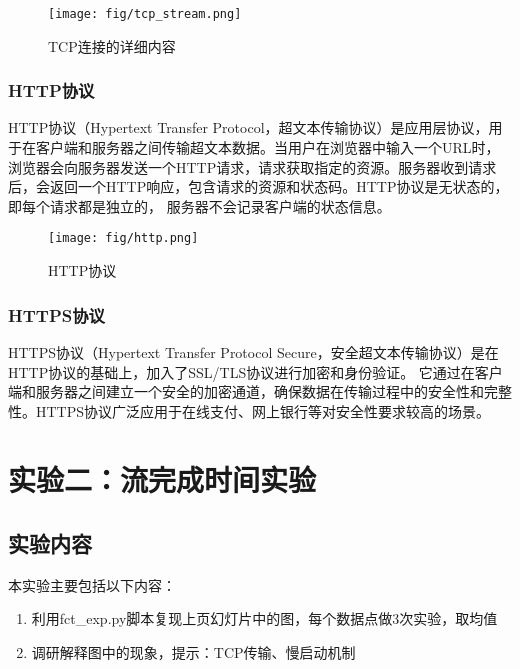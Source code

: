 \documentclass[11pt]{article}
\begin{document}
\begin{figure}[H]
  \centering
  \texttt{[image: fig/tcp\_stream.png]}
  \caption{TCP连接的详细内容}
  \label{fig:tcp_stream}
\end{figure}

\subsubsection{HTTP协议}
HTTP协议（Hypertext Transfer Protocol，超文本传输协议）是应用层协议，用于在客户端和服务器之间传输超文本数据。当用户在浏览器中输入一个URL时，
浏览器会向服务器发送一个HTTP请求，请求获取指定的资源。服务器收到请求后，会返回一个HTTP响应，包含请求的资源和状态码。HTTP协议是无状态的，即每个请求都是独立的，
服务器不会记录客户端的状态信息。

\begin{figure}[H]
  \centering
  \texttt{[image: fig/http.png]}
  \caption{HTTP协议}
  \label{fig:http}
\end{figure}

\subsubsection{HTTPS协议}
HTTPS协议（Hypertext Transfer Protocol Secure，安全超文本传输协议）是在HTTP协议的基础上，加入了SSL/TLS协议进行加密和身份验证。
它通过在客户端和服务器之间建立一个安全的加密通道，确保数据在传输过程中的安全性和完整性。HTTPS协议广泛应用于在线支付、网上银行等对安全性要求较高的场景。

\section{实验二：流完成时间实验}

\subsection{实验内容}
本实验主要包括以下内容：
\begin{enumerate}
  \item 利用fct_exp.py脚本复现上页幻灯片中的图，每个数据点做3次实验，取均值
  \item 调研解释图中的现象，提示：TCP传输、慢启动机制
\end{enumerate}
\end{document}

